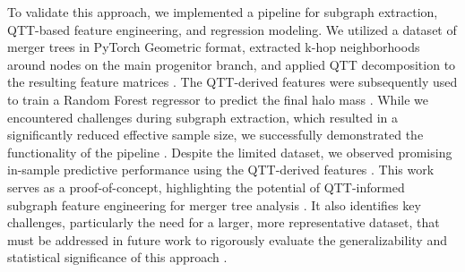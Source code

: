 \documentclass[twocolumn]{aastex631}
\begin{document}
To validate this approach, we implemented a pipeline for subgraph extraction, QTT-based feature engineering, and regression modeling.
We utilized a dataset of merger trees in PyTorch Geometric format, extracted k-hop neighborhoods around nodes on the main progenitor branch, and applied QTT decomposition to the resulting feature matrices \citep{jespersen2022textttmangrovelearninggalaxyproperties,jung2024mergertreebasedgalaxymatching}. The QTT-derived features were subsequently used to train a Random Forest regressor to predict the final halo mass \citep{robles2022deeplearningapproachhalo,jespersen2022textttmangrovelearninggalaxyproperties,jung2024mergertreebasedgalaxymatching}. While we encountered challenges during subgraph extraction, which resulted in a significantly reduced effective sample size, we successfully demonstrated the functionality of the pipeline \citep{jung2024mergertreebasedgalaxymatching}. Despite the limited dataset, we observed promising in-sample predictive performance using the QTT-derived features \citep{jespersen2022textttmangrovelearninggalaxyproperties}. This work serves as a proof-of-concept, highlighting the potential of QTT-informed subgraph feature engineering for merger tree analysis \citep{jespersen2022textttmangrovelearninggalaxyproperties,jung2024mergertreebasedgalaxymatching}. It also identifies key challenges, particularly the need for a larger, more representative dataset, that must be addressed in future work to rigorously evaluate the generalizability and statistical significance of this approach \citep{jung2024mergertreebasedgalaxymatching}.
\end{document}

